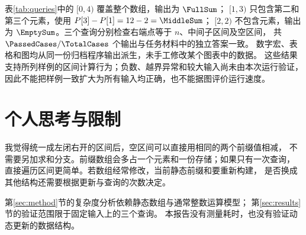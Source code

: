 \documentclass[a4paper,11pt,fontset=fandol]{ctexart}
\begin{document}
\begin{table}[htbp]
\centering

\caption{给定查询的独立答案与实际输出。}
\label{tab:queries}
\end{table}
表\ref{tab:queries}中的 $[0,4)$ 覆盖整个数组，输出为 $\FullSum$；
$[1,3)$ 只包含第二和第三个元素，使用 $P[3]-P[1]=12-2=\MiddleSum$；
$[2,2)$ 不包含元素，输出为 $\EmptySum$。三个查询分别检查右端点等于 $n$、中间子区间及空区间，
共 $\PassedCases/\TotalCases$ 个输出与任务材料中的独立答案一致。
数字宏、表格和图均从同一份归档程序输出派生，未手工修改某个图表中的数据。
这些结果支持所列样例的区间计算行为；负数、越界异常和较大输入尚未由本次运行验证，
因此不能把样例一致扩大为所有输入均正确，也不能据图评价运行速度。

\section{个人思考与限制}
\label{sec:thoughts}
我觉得统一成左闭右开的区间后，空区间可以直接用相同的两个前缀值相减，
不需要另加求和分支。前缀数组会多占一个元素和一份存储；如果只有一次查询，
直接遍历区间更简单。若数组经常修改，当前静态前缀和要重新构建，
是否换成其他结构还需要根据更新与查询的次数决定。

第\ref{sec:method}节的复杂度分析依赖静态数组与通常整数运算模型；
第\ref{sec:results}节的验证范围限于固定输入上的三个查询。
本报告没有测量耗时，也没有验证动态更新的数据结构。
\end{document}
